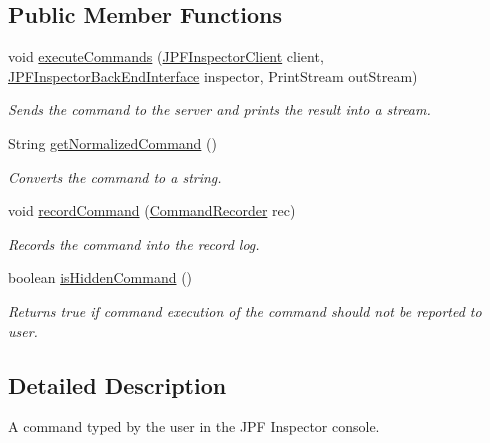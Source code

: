 \subsection*{Public Member Functions}
\begin{DoxyCompactItemize}
\item 
void \hyperlink{interfacegov_1_1nasa_1_1jpf_1_1inspector_1_1client_1_1_client_command_interface_a6cf0905afd7822cee3268e286a7dcdd0}{execute\+Commands} (\hyperlink{classgov_1_1nasa_1_1jpf_1_1inspector_1_1client_1_1_j_p_f_inspector_client}{J\+P\+F\+Inspector\+Client} client, \hyperlink{interfacegov_1_1nasa_1_1jpf_1_1inspector_1_1interfaces_1_1_j_p_f_inspector_back_end_interface}{J\+P\+F\+Inspector\+Back\+End\+Interface} inspector, Print\+Stream out\+Stream)
\begin{DoxyCompactList}\small\item\em Sends the command to the server and prints the result into a stream. \end{DoxyCompactList}\item 
String \hyperlink{interfacegov_1_1nasa_1_1jpf_1_1inspector_1_1client_1_1_client_command_interface_a393044f5be05c3ab3451b72aeff7af62}{get\+Normalized\+Command} ()
\begin{DoxyCompactList}\small\item\em Converts the command to a string. \end{DoxyCompactList}\item 
void \hyperlink{interfacegov_1_1nasa_1_1jpf_1_1inspector_1_1client_1_1_client_command_interface_a4ae9ac9bbb61d9a758ef168e8b3b04ff}{record\+Command} (\hyperlink{classgov_1_1nasa_1_1jpf_1_1inspector_1_1client_1_1_command_recorder}{Command\+Recorder} rec)
\begin{DoxyCompactList}\small\item\em Records the command into the record log. \end{DoxyCompactList}\item 
boolean \hyperlink{interfacegov_1_1nasa_1_1jpf_1_1inspector_1_1client_1_1_client_command_interface_a51ce7a884a74433b73d39d93528838cc}{is\+Hidden\+Command} ()
\begin{DoxyCompactList}\small\item\em Returns true if command execution of the command should not be reported to user. \end{DoxyCompactList}\end{DoxyCompactItemize}


\subsection{Detailed Description}
A command typed by the user in the J\+PF Inspector console. 

